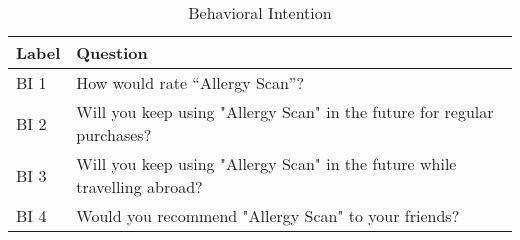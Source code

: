 \begin{table}[H]
\centering
\begin{tabular}{l l}

\toprule
Label & Question\\
\midrule
BI 1    &   How would rate “Allergy Scan”? \\
BI 2	&   Will you keep using "Allergy Scan" in the future for regular purchases? \\
BI 3	&   Will you keep using "Allergy Scan" in the future while travelling abroad? \\
BI 4	&   Would you recommend "Allergy Scan" to your friends? \\
\bottomrule

\end{tabular}
\caption{Behavioral Intention}
\end{table}